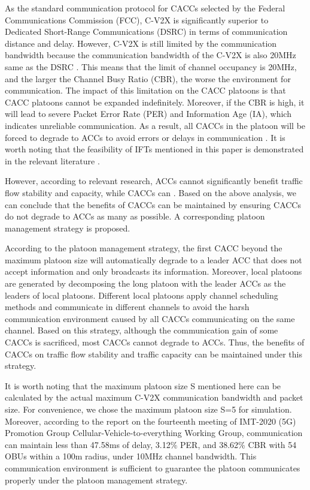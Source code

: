 \documentclass[journal]{IEEEtran}
\begin{document}
As the standard communication protocol for CACCs selected by the Federal Communications Commission (FCC), C-V2X is significantly superior to Dedicated Short-Range Communications (DSRC) in terms of communication distance and delay. However, C-V2X is still limited by the communication bandwidth because the communication bandwidth of the C-V2X is also 20MHz same as the DSRC \citep{Boubakri2020,Chen2020,Nardini2018}. This means that the limit of channel occupancy is 20MHz, and the larger the Channel Busy Ratio (CBR), the worse the environment for communication. The impact of this limitation on the CACC platoons is that CACC platoons cannot be expanded indefinitely. Moreover, if the CBR is high, it will lead to severe Packet Error Rate (PER) and Information Age (IA), which indicates unreliable communication. As a result, all CACCs in the platoon will be forced to degrade to ACCs to avoid errors or delays in communication \citep{Vukadinovic2018,Vu2020}. It is worth noting that the feasibility of IFTs mentioned in this paper is demonstrated in the relevant literature \citep{zheng2015stability,Martin-Sacristan2020,Thota2019,Pirani2022}.

However, according to relevant research, ACCs cannot significantly benefit traffic flow stability and capacity, while CACCs can \citep{Shang2021,Shladover2012,Nikolos2015}. Based on the above analysis, we can conclude that the benefits of CACCs can be maintained by ensuring CACCs do not degrade to ACCs as many as possible. A corresponding platoon management strategy is proposed.


According to the platoon management strategy, the first CACC beyond the maximum platoon size will automatically degrade to a leader ACC that does not accept information and only broadcasts its information. Moreover, local platoons are generated by decomposing the long platoon with the leader ACCs as the leaders of local platoons. Different local platoons apply channel scheduling methods and communicate in different channels to avoid the harsh communication environment caused by all CACCs communicating on the same channel. Based on this strategy, although the communication gain of some CACCs is sacrificed, most CACCs cannot degrade to ACCs. Thus, the benefits of CACCs on traffic flow stability and traffic capacity can be maintained under this strategy.

It is worth noting that the maximum platoon size S mentioned here can be calculated by the actual maximum C-V2X communication bandwidth and packet size. For convenience, we chose the maximum platoon size S=5 for simulation. Moreover, according to the report on the fourteenth meeting of IMT-2020 (5G) Promotion Group Cellular-Vehicle-to-everything Working Group, communication can maintain less than 47.58ms of delay, 3.12\% PER, and 38.62\% CBR with 54 OBUs within a 100m radius, under 10MHz channel bandwidth. This communication environment is sufficient to guarantee the platoon communicates properly under the platoon management strategy.
\end{document}
